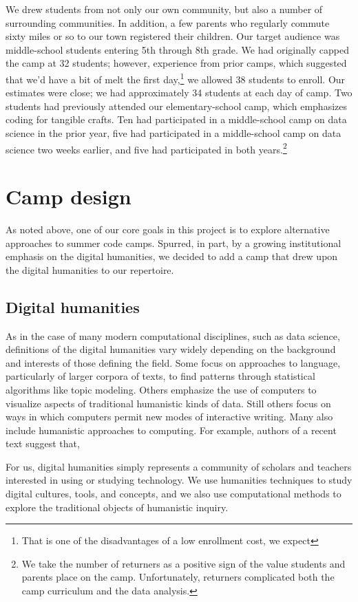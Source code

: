 We drew students from not only our own community, but also a number
of surrounding communities.  In addition, a few parents who regularly
commute sixty miles or so to our town registered their children.  Our
target audience was middle-school students entering 5th through 8th grade.
We had originally capped the camp at 32 students; however, experience
from prior camps, which suggested that we'd have a bit of melt the
first day,\footnote{That is one of the disadvantages of a low enrollment cost, we
expect} we allowed 38 students to enroll.  Our estimates were close;
we had approximately 34 students at each day of camp.  Two students
had previously attended our elementary-school camp, which emphasizes
coding for tangible crafts.  Ten had participated in a middle-school
camp on data science in the prior year, five had participated in
a middle-school camp on data science two weeks earlier, and five
had participated in both years.\footnote{We take the number of returners
as a positive sign of the value students and parents place on the camp.
Unfortunately, returners complicated both the camp curriculum and the
data analysis.}  

\section{Camp design}

As noted above, one of our core goals in this project is to explore
alternative approaches to summer code camps.  Spurred, in part, by
a growing institutional emphasis on the digital humanities, we
decided to add a camp that drew upon the digital humanities to our
repertoire.

\subsection{Digital humanities}

As in the case of many modern computational disciplines, such as
data science, definitions of the digital humanities vary widely
depending on the background and interests of those defining the
field.  Some focus on approaches to language, particularly of larger
corpora of texts, to find patterns through statistical algorithms
like topic modeling.  Others emphasize the use of computers to
visualize aspects of traditional humanistic kinds of data.  Still
others focus on ways in which computers permit new modes of interactive
writing.  Many also include humanistic approaches to computing.
For example, authors of a recent text suggest that,
\begin{blockquote}
For us, digital humanities simply represents a community of scholars and teachers interested in using or studying technology. We use humanities techniques to study digital cultures, tools, and concepts, and we also use computational methods to explore the traditional objects of humanistic inquiry. \cite{Battershill2017}
\end{blockquote}

